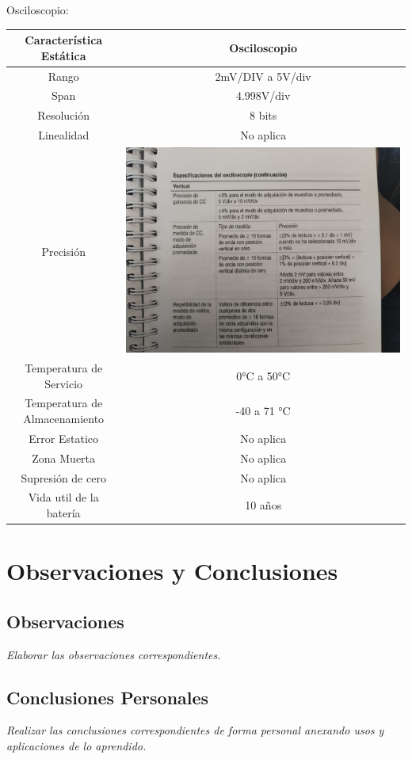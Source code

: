 \documentclass[11pt]{scrartcl}
\newcommand{\indicacion}[1]{\noindent\textit{\small #1}}
\begin{document}
Osciloscopio:
\begin{center}
\begin{tabular}{|c|c|}
\hline
\textbf{Característica Estática}& \textbf{Osciloscopio} \\
\hline
Rango &  2mV/DIV a 5V/div \\
    \hline
    Span & 4.998V/div \\
    \hline
    Resolución & 8 bits \\
    \hline 
    Linealidad & No aplica \\
    \hline 
    Precisión & \includegraphics[scale=0.2]{Precisionosc.jpg} \\
    \hline 
    Temperatura de Servicio  & 0°C a 50°C \\
    \hline 
    Temperatura de Almacenamiento & -40 a 71 °C \\
    \hline 
    Error Estatico & No aplica \\
    \hline 
    Zona Muerta  & No aplica \\
    \hline 
    Supresión de cero & No aplica \\
    \hline 
    Vida util de la batería & 10 años \\
    \hline


\end{tabular}
\end{center}


\section{Observaciones y Conclusiones}

\subsection{Observaciones}
\indicacion{
    Elaborar las observaciones correspondientes.
}

\subsection{Conclusiones Personales}
\indicacion{
    Realizar las conclusiones correspondientes de forma personal anexando usos y aplicaciones de lo aprendido.
}


  

    
\end{document}
